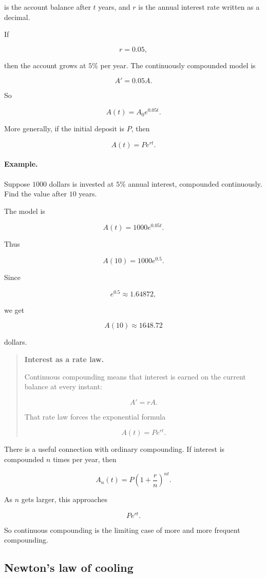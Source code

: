 is the account balance after \(t\) years, and \(r\) is the annual interest rate written as a
decimal.

If

\[
r=0.05,
\]

then the account grows at \(5\%\) per year.  The continuously compounded model is

\[
A'=0.05A.
\]

So

\[
\boxed{
A(t)=A_0e^{0.05t}.
}
\]

More generally, if the initial deposit is \(P\), then

\[
\boxed{
A(t)=Pe^{rt}.
}
\]

\paragraph{Example.}
Suppose \(1000\) dollars is invested at \(5\%\) annual interest, compounded
continuously.  Find the value after \(10\) years.

The model is

\[
A(t)=1000e^{0.05t}.
\]

Thus

\[
A(10)=1000e^{0.5}.
\]

Since

\[
e^{0.5}\approx1.64872,
\]

we get

\[
\boxed{
A(10)\approx1648.72
}
\]

dollars.

\begin{quote}
\textbf{Interest as a rate law.}

Continuous compounding means that interest is earned on the current balance at every
instant:

\[
A'=rA.
\]

That rate law forces the exponential formula

\[
A(t)=Pe^{rt}.
\]
\end{quote}

There is a useful connection with ordinary compounding.  If interest is compounded
\(n\) times per year, then

\[
A_n(t)=P\left(1+\frac{r}{n}\right)^{nt}.
\]

As \(n\) gets larger, this approaches

\[
Pe^{rt}.
\]

So continuous compounding is the limiting case of more and more frequent
compounding.

\subsection{Newton's law of cooling}
\label{subsec:newtons-law-cooling}

